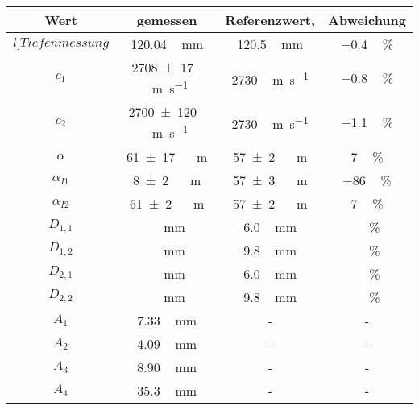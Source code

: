 \label{tab:Ergebnisse}
	\begin{tabular}{c ccc}
		\toprule
		{Wert}&{gemessen}&{Referenzwert\cite{cAcryl},\cite{alphaAcryl}}&{Abweichung} \\
		\midrule
		$l_.{Tiefenmessung}$ & \SI{120.04}\,\si{\milli\meter} & \SI{120.5}\,\si{\milli\meter} & \SI{-0.4}\,\si{\percent} \\
		$c_\text{1}$ & \SI{2708\pm17}\,\si{\meter\per\second} & \SI{2730}\,\si{\meter\per\second} & \SI{-0.8}\,\si{\percent} \\
		$c_\text{2}$ & \SI{2700\pm120}\,\si{\meter\per\second} & \SI{2730}\,\si{\meter\per\second} & \SI{-1.1}\,\si{\percent} \\
		$\alpha$ & \SI{61\pm17}\,\si{\per\meter} & \SI{57\pm2}\,\si{\per\meter} & \SI{7}\,\si{\percent} \\
		$\alpha_{I1}$ & \SI{8\pm2}\,\si{\per\meter} & \SI{57\pm3}\,\si{\per\meter} & \SI{-86}\,\si{\percent} \\
		$\alpha_{I2}$ & \SI{61\pm2}\,\si{\per\meter} & \SI{57\pm2}\,\si{\per\meter} & \SI{7}\,\si{\percent} \\
		$D_{1,1}$ & \SI{}\,\si{\milli\meter} & \SI{6.0}\,\si{\milli\meter} & \SI{}\,\si{\percent} \\
		$D_{1,2}$ & \SI{}\,\si{\milli\meter} & \SI{9.8}\,\si{\milli\meter} & \SI{}\,\si{\percent} \\
		$D_{2,1}$ & \SI{}\,\si{\milli\meter} & \SI{6.0}\,\si{\milli\meter} & \SI{}\,\si{\percent} \\
		$D_{2,2}$ & \SI{}\,\si{\milli\meter} & \SI{9.8}\,\si{\milli\meter} & \SI{}\,\si{\percent} \\
		$A_1$ & \SI{7.33}\,\si{\milli\meter} & - & - \\
		$A_2$ & \SI{4.09}\,\si{\milli\meter} & - & - \\
		$A_3$ & \SI{8.90}\,\si{\milli\meter} & - & - \\
		$A_4$ & \SI{35.3}\,\si{\milli\meter} & - & - \\
		\bottomrule
	\end{tabular}
